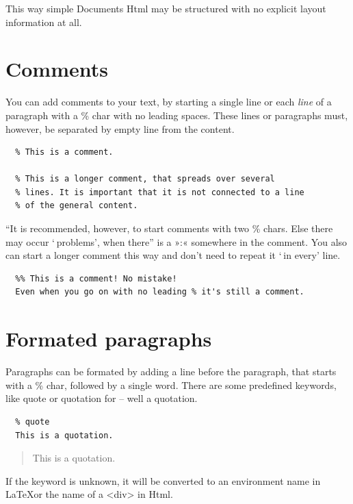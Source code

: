 \documentclass{article}
\begin{document}
This way simple Documents Html may be structured with no explicit
layout information at all.

\section{Comments}

You can add comments to your text, by starting a single line
or each \emph{line} of a paragraph with a \% char with no leading
spaces. These lines or paragraphs must, however, be
separated by empty line from the content.

\begin{verbatim}
  % This is a comment.

  % This is a longer comment, that spreads over several
  % lines. It is important that it is not connected to a line
  % of the general content.

\end{verbatim}

“It is recommended, however, to start comments with two \% chars.
Else there may occur ‘ problems’, when there” is a »:« somewhere
in the comment. You also can start a longer comment this way
and don't need to repeat it ‘ in every’ line.

\begin{verbatim}
  %% This is a comment! No mistake!
  Even when you go on with no leading % it's still a comment.

\end{verbatim}


\section{Formated paragraphs}

Paragraphs can be formated by adding a line before the
paragraph, that starts with a \% char, followed by a single
word. There are some predefined keywords, like quote or
quotation for – well a quotation.

\begin{verbatim}
  % quote
  This is a quotation.

\end{verbatim}

\begin{quote}
This is a quotation.

\end{quote}

If the keyword is unknown, it will be converted to an environment
name in \LaTeX or the name of a <div> in Html.
\end{document}
